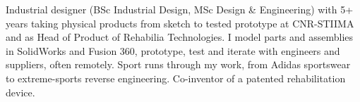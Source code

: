 {Industrial designer (BSc Industrial Design, MSc Design \& Engineering) with 5+ years taking physical products from sketch to tested prototype at CNR-STIIMA and as Head of Product of Rehabilia Technologies. I model parts and assemblies in SolidWorks and Fusion 360, prototype, test and iterate with engineers and suppliers, often remotely. Sport runs through my work, from Adidas sportswear to extreme-sports reverse engineering. Co-inventor of a patented rehabilitation device.}
